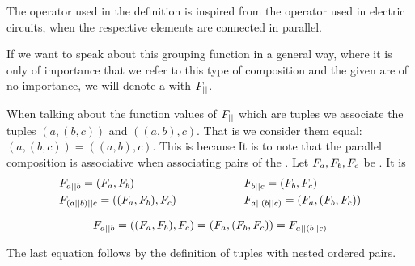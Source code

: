 \documentclass[preview]{standalone}
\begin{document}
The operator \pll used in the definition is inspired from the operator used in electric circuits, when the respective elements are connected in parallel.

If we want to speak about this grouping function in a general way, where it is only of importance that we refer to this type of composition and the given \grpfctsN are of no importance, we will denote a \emph{\parllcompN \grpfctN} with $\grpfct[\pll]$.

When talking about the function values of $\grpfct[\pll]$ which are tuples we associate the tuples $(a, (b, c))$ and $((a, b), c)$. That is we consider them equal: $(a, (b, c)) = ((a, b), c)$. This is because It is to note that the parallel composition is associative when associating pairs of the  . Let $\grpfct[a], \grpfct[b], \grpfct[c]$ be \grpfctsN. It is
\begin{equation*}
	\begin{aligned}[c]
		&\grpfct[a \pll b] = (\grpfct[a], \grpfct[b]) \\
		&\grpfct[(a \pll b) \pll c] = ((\grpfct[a], \grpfct[b]), \grpfct[c])
	\end{aligned}
	\quad\quad\quad\quad\quad\quad
	\begin{aligned}[c]
		&\grpfct[b \pll c] = (\grpfct[b], \grpfct[c]) \\
		&\grpfct[a \pll (b \pll c)] = (\grpfct[a], (\grpfct[b], \grpfct[c]))\\
	\end{aligned}					
\end{equation*}

\[
\grpfct[a \pll b] = ((\grpfct[a], \grpfct[b]), \grpfct[c]) = (\grpfct[a], (\grpfct[b], \grpfct[c])) = \grpfct[a \pll (b \pll c)]
\]

The last equation follows by the definition of tuples with nested ordered pairs.



\end{document}
